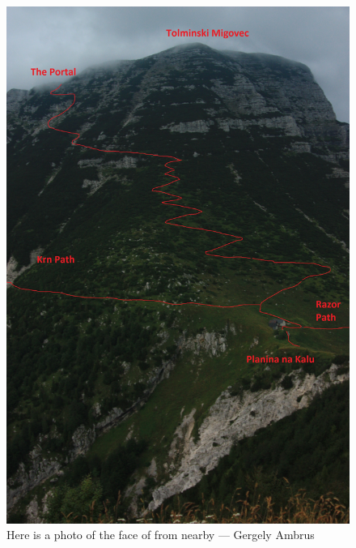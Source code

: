 \begin{figure}
\includegraphics[width=\linewidth]{images/2013/welcome-2013/gergely_mig-path.jpg} \caption{Here is a photo of the face of \protect{} from nearby \protect{}--- Gergely Ambrus}
\end{figure}
